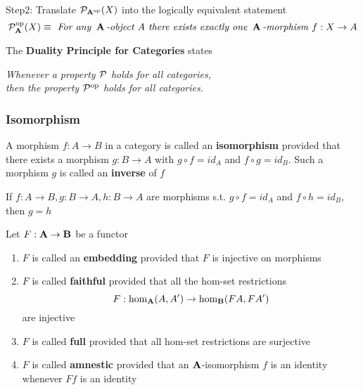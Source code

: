 \documentclass[11pt]{article}
\begin{document}
Step2: Translate \(\mathcal{P}_{\operatorname{\textbf{A}}^{\operatorname{op}}}(X)\) into the logically equivalent
statement
\begin{equation*}
\mathcal{P}_{\operatorname{\textbf{A}}}^{\operatorname{op}}(X)\equiv \textit{ For any } \operatorname{\textbf{A}}\textit{-object } A
\textit{ there exists exactly one }
\operatorname{\textbf{A}}\textit{-morphism } f:X\to A
\end{equation*}

The \textbf{Duality Principle for Categories} states
\begin{center}
\textit{Whenever a property \(\mathcal{P}\) holds for all categories,}\\
\textit{then the property \(\mathcal{P}^{\operatorname{op}}\) holds for all categories.}
\end{center}
\subsubsection{Isomorphism}
\label{sec:orgd91d43e}
\begin{definition}[]
A morphism \(f:A\to B\) in a category is called an \textbf{isomorphism} provided that
there exists a morphism \(g:B\to A\) with \(g\circ f=id_A\) and \(f\circ
   g=id_B\). Such a morphism \(g\) is called an \textbf{inverse} of \(f\)
\end{definition}

\begin{proposition}[]
If \(f:A\to B,g:B\to A,h:B\to A\) are morphisms s.t. \(g\circ f=id_A\) and
\(f\circ h=id_B\), then \(g=h\)
\end{proposition}

\begin{definition}[]
Let \(F:\operatorname{\textbf{A}}\to\operatorname{\textbf{B}}\)  be a functor
\begin{enumerate}
\item \(F\) is called an \textbf{embedding} provided that \(F\) is injective on morphisms
\item \(F\) is called \textbf{faithful} provided that all the hom-set restrictions
\begin{equation*}
F:\operatorname{hom}_{\operatorname{\textbf{A}}}(A,A')\to\operatorname{hom}_{\operatorname{\textbf{B}}}(FA,FA')
\end{equation*}
are injective
\item \(F\) is called \textbf{full} provided that all hom-set restrictions are surjective
\item \(F\) is called \textbf{amnestic} provided that an \(\operatorname{\textbf{A}}\)-isomorphism \(f\) is an
identity whenever \(Ff\) is an identity
\end{enumerate}
\end{definition}
\end{document}
